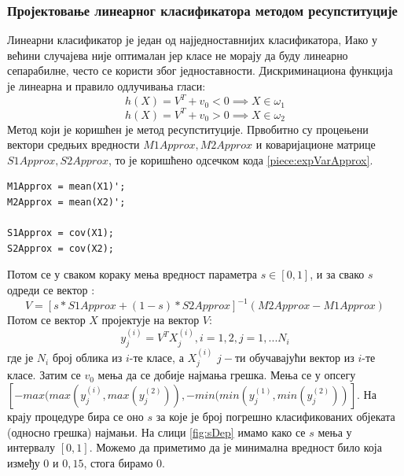 \subsubsection{Пројектовање линеарног класификатора методом ресупституције}
Линеарни класификатор је један од најједноставнијих класификатора, Иако у већини случајева није оптималан јер класе не морају да буду линеарно сепарабилне, често се користи због једноставности. Дискриминациона функција је линеарна и правило одлучивања гласи:
$$h(X) = V^T + v_0 < 0 \implies X \in \omega_1$$
$$h(X) = V^T + v_0 >0 \implies X \in \omega_2$$
Метод који је коришћен је метод ресупституције. Првобитно су процењени вектори средњих вредности $M1Approx, M2Approx$ и коваријационе матрице $S1Approx, S2Approx$, то је коришћено одсечком кода \ref{piece:expVarApprox}.

\begin{lstlisting}[caption={Процена математичког очекивања и ковариационе матрице},label={piece:expVarApprox}]
M1Approx = mean(X1)';
M2Approx = mean(X2)';

S1Approx = cov(X1);
S2Approx = cov(X2); 
\end{lstlisting}
Потом се у сваком кораку мења вредност параметра $s \in \left[ 0, 1\right] $,
и за свако $s$ одреди се вектор :
$$V=\left[ s * S1Approx + (1 - s)*S2Approx\right]^{-1}(M2Approx - M1Approx)$$
Потом се вектор $X$ пројектује на вектор $V$:
$$y_j^{(i)} = V^T X_j^{(i)}, i = 1, 2, j=1, ... N_i$$
где је $N_i$ број облика из $i$-те класе, а $X_j^{(i)}$ $j-$ти обучавајући вектор из $i$-те класе. Затим се $v_0$ мења да се добије најмања грешка. Мења се у опсегу $\left[ -max(max(y_j^{(i)}, max(y_j^{(2)})), -min(min(y_j^{(1)}, min(y_j^{(2)}))\right]$. На крају процедуре бира се оно $s$ за које је број погрешно класификованих објеката (односно грешка) најмањи. 
На слици \ref{fig:sDep} имамо како се $s$ мења у интервалу $\left[0, 1\right]$. Можемо да приметимо да је минимална вредност било која између $0$ и $0, 15$, стога бирамо $0$. 

